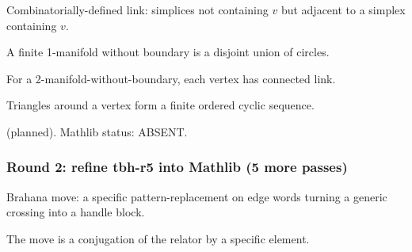 \begin{lemma}
\label{lem:rvl-r6}
Combinatorially-defined link: simplices not containing $v$ but adjacent to a simplex containing $v$.
\leanok
\end{lemma}

\begin{lemma}
\label{lem:rvl-r7}
A finite 1-manifold without boundary is a disjoint union of circles.
\leanok
\end{lemma}

\begin{lemma}
\label{lem:rvl-r8}
For a 2-manifold-without-boundary, each vertex has connected link.
\leanok
\end{lemma}

\begin{lemma}
\label{lem:rvl-r9}
Triangles around a vertex form a finite ordered cyclic sequence.
\leanok
\end{lemma}

\begin{lemma}
\label{lem:rvl-r10}
 (planned).  Mathlib status: ABSENT.
\leanok
\end{lemma}

\subsubsection*{Round 2: refine tbh-r5 into Mathlib (5 more passes)}

\begin{lemma}
\label{lem:tbh-r6}
Brahana move: a specific pattern-replacement on edge words turning a generic crossing into a handle block.
\leanok
\end{lemma}

\begin{lemma}
\label{lem:tbh-r7}
The move is a conjugation of the relator by a specific element.
\leanok
\end{lemma}

